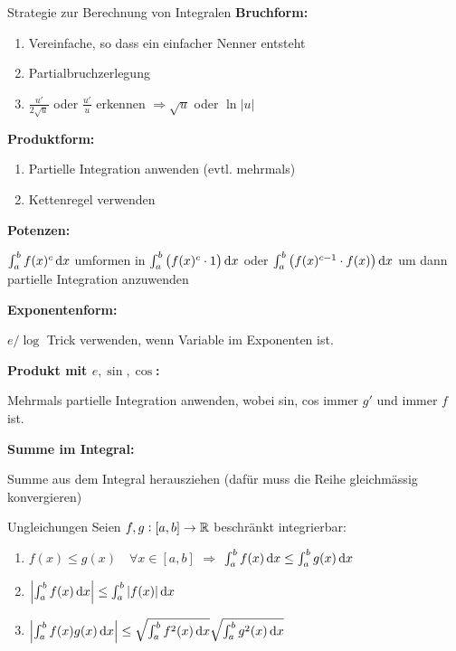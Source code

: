 \begin{KR}{Strategie zur Berechnung von Integralen}
    \textbf{Bruchform:}
    \begin{enumerate}
        \item Vereinfache, so dass ein einfacher Nenner entsteht
        \item Partialbruchzerlegung
        \item $\frac{u'}{2\sqrt{u}}$ oder $\frac{u'}{u}$ erkennen $\Rightarrow \sqrt{u}$ oder $\ln|u|$
    \end{enumerate}

    \textbf{Produktform:}
    \begin{enumerate}
        \item Partielle Integration anwenden (evtl. mehrmals)
        \item Kettenregel verwenden
    \end{enumerate}

    \textbf{Potenzen:}

    $\int_{a}^{b} f(x)^{c} \dif x$ umformen in $\int_{a}^{b}\left(f(x)^{c} \cdot 1\right) \dif x$ oder $\int_{a}^{b}\left(f(x)^{c-1} \cdot f(x)\right) \dif x$ um dann partielle Integration anzuwenden

    \textbf{Exponentenform:}

    $e / \log$ Trick verwenden, wenn Variable im Exponenten ist.

    \textbf{Produkt mit $e, \sin , \cos$:}

    Mehrmals partielle Integration anwenden, wobei sin, cos immer $g'$ und immer $f$ ist.

    \textbf{Summe im Integral:}

    Summe aus dem Integral herausziehen (dafür muss die Reihe gleichmässig konvergieren)
\end{KR}

\begin{corollary}{Ungleichungen}
    Seien $f,g : [a,b] \to \mathbb{R}$ beschränkt integrierbar:
    \begin{enumerate}
        \item $f(x) \leq g(x) \quad \forall x \in [a,b]$ $\Rightarrow$ $\int_a^b f(x) \dif x \leq \int_a^b g(x) \dif x$
        \item $\left| \int_a^b f(x) \dif x \right| \leq \int_a^b |f(x)| \dif x$
        \item $\left| \int_a^b f(x) g(x) \dif x \right| \leq \sqrt{\int_{a}^{b} f^2(x) \dif x} \sqrt{\int_{a}^{b} g^2(x) \dif x}$
    \end{enumerate}
\end{corollary}

